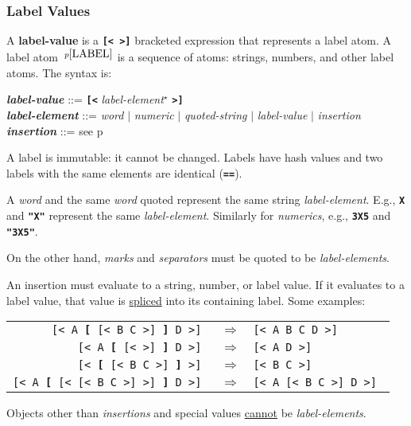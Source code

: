 \documentclass[12pt]{article}
\newcommand{\TT}[1]{{\tt \bfseries #1}}
\newcommand{\key}[1]{{\rm \bfseries #1}}
\newcommand{\emkey}[1]{{\em \bfseries #1}}
\newcommand{\pagref}[1]{p\pageref{#1}}
\newcommand{\pagnote}[1]{$\,^{p\pageref{#1}}$}
\newcommand{\STAR}{{\Large $^\star$}}
\newenvironment{indpar}[1][0.3in]%
	{\begin{list}{}%
		     {\setlength{\itemsep}{0in}%
		      \setlength{\topsep}{0in}%
		      \setlength{\parsep}{1ex}%
		      \setlength{\labelwidth}{#1}%
		      \setlength{\leftmargin}{#1}%
		      \addtolength{\leftmargin}{\labelsep}}%
	 \item}%
	{\end{list}}
\begin{document}
\subsubsection{Label Values}
\label{LABEL-VALUES}

A \key{label-value} is a \TT{[<~>]} bracketed expression that represents
a label atom.  A label atom \pagnote{LABEL} is a sequence of atoms:
strings, numbers, and other label atoms.  The syntax is:

\begin{indpar}
\emkey{label-value} ::= \TT{[<} {\em label-element}\STAR{} \TT{>]} \\
\emkey{label-element} ::= {\em word} $|$ {\em numeric}
                                     $|$ {\em quoted-string}
                                     $|$ {\em label-value}
                                     $|$ {\em insertion} \\
\emkey{insertion} ::= see \pagref{INSERTIONS}
\end{indpar}

A label is immutable: it cannot be changed.  Labels have hash values
and two labels with the same elements are identical (\TT{==}).

A {\em word} and the same {\em word} quoted represent the same string
{\em label-element}.  E.g., \TT{X} and \TT{"X"} represent the same
{\em label-element}.  Similarly for {\em numerics}, e.g., \TT{3X5} and
\TT{"3X5"}.

On the other hand, {\em marks} and {\em separators} must be quoted
to be {\em label-elements}.

An insertion must evaluate to a string, number, or label value.
If it evaluates to a label value, that value is \underline{spliced}
into its containing label.  Some examples:
\begin{center}
\begin{tabular}{rcl}
\tt [< A \TT{[} [< B C >] \TT{]} D >] & $\Longrightarrow$ & \tt [< A B C D >] \\
\tt [< A \TT{[} [< >] \TT{]} D >] & $\Longrightarrow$ & \tt [< A D >] \\
\tt [< \TT{[} [< B C >] \TT{]} >] & $\Longrightarrow$ & \tt [< B C >] \\
\tt [< A \TT{[} [< [< B C >] >] \TT{]} D >] & $\Longrightarrow$
                                        & \tt [< A [< B C >] D >] \\
\end{tabular}
\end{center}

Objects other than {\em insertions} and special values \underline{cannot}
be {\em label-elements}.
\end{document}
